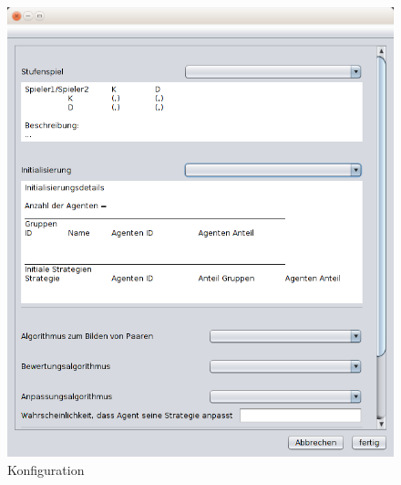 \begin{figure}[!hp] 
  \centering
     \includegraphics[width=1.0\textwidth]{GUI_Entwurf/NeueKonfiguration1.png}
  \caption{Konfiguration}
  \label{fig:Bild2}
\end{figure}



